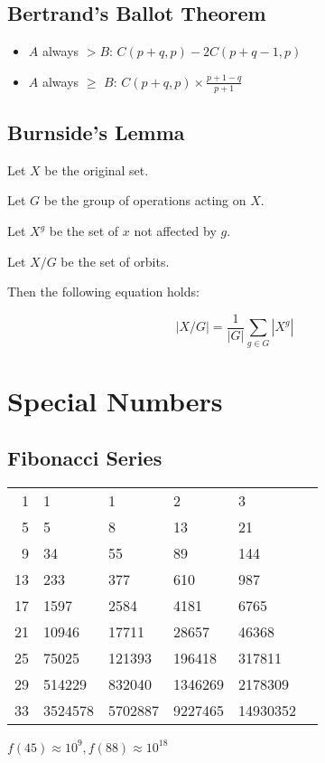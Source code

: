 \documentclass[a4paper,10pt,twocolumn,oneside]{article}
\begin{document}
\subsection{Bertrand's Ballot Theorem}

\begin{itemize}
    \item $A$ always $> B$: $C(p+q, p) - 2 C(p+q-1, p)$
    \item $A$ always $\geq$ $B$: $C(p+q, p) \times \frac{p + 1 - q}{p + 1}$
\end{itemize}


\subsection{Burnside's Lemma}
{\normalsize
Let $X$ be the original set.

Let $G$ be the group of operations acting on $X$.

Let $X^g$ be the set of $x$ not affected by $g$.

Let $X/G$ be the set of orbits.

Then the following equation holds:

$$
|X/G| = \frac{1}{|G|} \sum_{g \in G} |X^g|
$$
}

\section{Special Numbers}

\subsection{Fibonacci Series}

{\normalsize
\begin{center}
    \begin{tabular}{r|lllll}
        1 & 1 & 1 & 2 & 3 \\
        5 & 5 & 8 & 13 & 21 \\
        9 & 34 & 55 & 89 & 144 \\
        13 & 233 & 377 & 610 & 987 \\
        17 & 1597 & 2584 & 4181 & 6765 \\
        21 & 10946 & 17711 & 28657 & 46368 \\
        25 & 75025 & 121393 & 196418 & 317811 \\
        29 & 514229 & 832040 & 1346269 & 2178309 \\
        33 & 3524578 & 5702887 & 9227465 & 14930352
    \end{tabular}
\end{center}
\noindent
$f(45) \approx 10^9, f(88) \approx 10^{18}$
}
\end{document}
